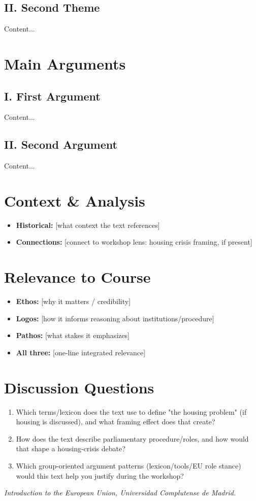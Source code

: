\documentclass[11pt,a4paper]{article}
\begin{document}
\subsection*{II. Second Theme}
Content...

\section*{Main Arguments}
\subsection*{I. First Argument}
Content...

\subsection*{II. Second Argument}
Content...

\section*{Context & Analysis}
\begin{itemize}
\item \textbf{Historical:} [what context the text references]
\item \textbf{Connections:} [connect to workshop lens: housing crisis framing, if present]
\end{itemize}

\section*{Relevance to Course}
\begin{itemize}
\item \textbf{Ethos:} [why it matters / credibility]
\item \textbf{Logos:} [how it informs reasoning about institutions/procedure]
\item \textbf{Pathos:} [what stakes it emphasizes]
\item \textbf{All three:} [one-line integrated relevance]
\end{itemize}

\section*{Discussion Questions}
\begin{enumerate}
\item Which terms/lexicon does the text use to define "the housing problem" (if housing is discussed), and what framing effect does that create?
\item How does the text describe parliamentary procedure/roles, and how would that shape a housing-crisis debate?
\item Which group-oriented argument patterns (lexicon/tools/EU role stance) would this text help you justify during the workshop?
\end{enumerate}

\vspace{1em}
\noindent\footnotesize\textit{Introduction to the European Union, Universidad Complutense de Madrid.}
\end{document}

